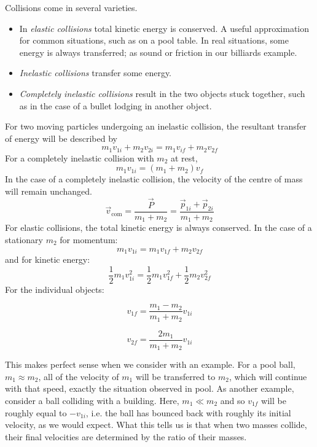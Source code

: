 \documentclass[12pt]{report}
\begin{document}
\begin{flushleft}
\bigskip
Collisions come in several varieties.

\begin{itemize}
    \item In \textit{elastic collisions} total kinetic energy is conserved.
    A useful approximation for common situations, such as on a pool table. 
    In real situations, some energy is always transferred; as sound or friction
    in our billiards example.
    \item \textit{Inelastic collisions} transfer some energy.
    \item \textit{Completely inelastic collisions} result in the two objects
    stuck together, such as in the case of a bullet lodging in another object. 
\end{itemize}
For two moving particles undergoing an inelastic collision, the resultant
transfer of energy will be described by
\[m_1v_{1i} + m_2v_{2i} = m_1v_{if} + m_2v_{2f}\]
For a completely inelastic collision with \(m_2\) at rest,
\[m_1v_{1i} = (m_1 + m_2)v_f\]
In the case of a completely inelastic collision, the velocity of the centre
of mass will remain unchanged.
\[\vec{v}_{\mathrm{com}} = \frac{\vec{P}}{m_1 + m_2} = \frac{\vec{p}_{1i} + 
\vec{p}_{2i}}{m_1 + m_2}\]
For elastic collisions, the total kinetic energy is always conserved. In the
case of a stationary \(m_2\) for momentum:
\[m_1v_{1i} = m_1v_{1f} + m_2v_{2f}\]
and for kinetic energy:
\[\frac{1}{2}m_1v^2_{1i} = \frac{1}{2}m_1v^2_{1f} + \frac{1}{2}m_2v^2_{2f}\]
For the individual objects:

\begin{minipage}[h]{0.4\linewidth}
    \[v_{1f} = \frac{m_1 - m_2}{m_1 + m_2}v_{1i}\]    
\end{minipage}
\begin{minipage}[h]{0.4\linewidth}
    \[v_{2f} = \frac{2m_1}{m_1 + m_2}v_{1i}\]    
\end{minipage}

\bigskip
This makes perfect sense when we consider with an example. For a pool ball, 
\(m_1 \approx m_2\), all of the velocity of \(m_1\) will be transferred to
\(m_2\), which will continue with that speed, exactly the situation observed
in pool. As another example, consider a ball colliding with a building. Here,
\(m_1 \ll m_2\) and so \(v_{1f}\) will be roughly equal to \(-v_{1i}\), i.e.
the ball has bounced back with roughly its initial velocity, as we would 
expect. What this tells us is that when two masses collide, their final 
velocities are determined by the ratio of their masses.


\end{flushleft}
\end{document}
